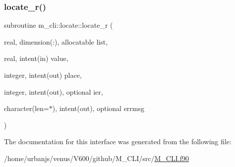 \mbox{\label{interfacem__cli_1_1locate_a128461b6770cea9575da2b98f9803dfb}} 
\subsubsection{\texorpdfstring{locate\+\_\+r()}{locate\_r()}}
{\footnotesize\ttfamily subroutine m\+\_\+cli\+::locate\+::locate\+\_\+r (\begin{DoxyParamCaption}\item[{real, dimension(\+:), allocatable}]{list,  }\item[{real, intent(in)}]{value,  }\item[{integer, intent(out)}]{place,  }\item[{integer, intent(out), optional}]{ier,  }\item[{character(len=$\ast$), intent(out), optional}]{errmsg }\end{DoxyParamCaption})\hspace{0.3cm}{\ttfamily [private]}}



The documentation for this interface was generated from the following file\+:\begin{DoxyCompactItemize}
\item 
/home/urbanjs/venus/\+V600/github/\+M\+\_\+\+C\+L\+I/src/\mbox{\hyperlink{M__CLI_8f90}{M\+\_\+\+C\+L\+I.\+f90}}\end{DoxyCompactItemize}
